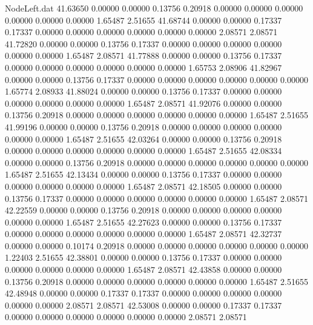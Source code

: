 \begin{filecontents}{NodeLeft.dat}
  41.63650    0.00000    0.00000     0.13756    0.20918    0.00000    0.00000    0.00000    0.00000    0.00000    0.00000    1.65487    2.51655
  41.68744    0.00000    0.00000     0.17337    0.17337    0.00000    0.00000    0.00000    0.00000    0.00000    0.00000    2.08571    2.08571
  41.72820    0.00000    0.00000     0.13756    0.17337    0.00000    0.00000    0.00000    0.00000    0.00000    0.00000    1.65487    2.08571
  41.77888    0.00000    0.00000     0.13756    0.17337    0.00000    0.00000    0.00000    0.00000    0.00000    0.00000    1.65753    2.08906
  41.82967    0.00000    0.00000     0.13756    0.17337    0.00000    0.00000    0.00000    0.00000    0.00000    0.00000    1.65774    2.08933
  41.88024    0.00000    0.00000     0.13756    0.17337    0.00000    0.00000    0.00000    0.00000    0.00000    0.00000    1.65487    2.08571
  41.92076    0.00000    0.00000     0.13756    0.20918    0.00000    0.00000    0.00000    0.00000    0.00000    0.00000    1.65487    2.51655
  41.99196    0.00000    0.00000     0.13756    0.20918    0.00000    0.00000    0.00000    0.00000    0.00000    0.00000    1.65487    2.51655
  42.03264    0.00000    0.00000     0.13756    0.20918    0.00000    0.00000    0.00000    0.00000    0.00000    0.00000    1.65487    2.51655
  42.08334    0.00000    0.00000     0.13756    0.20918    0.00000    0.00000    0.00000    0.00000    0.00000    0.00000    1.65487    2.51655
  42.13434    0.00000    0.00000     0.13756    0.17337    0.00000    0.00000    0.00000    0.00000    0.00000    0.00000    1.65487    2.08571
  42.18505    0.00000    0.00000     0.13756    0.17337    0.00000    0.00000    0.00000    0.00000    0.00000    0.00000    1.65487    2.08571
  42.22559    0.00000    0.00000     0.13756    0.20918    0.00000    0.00000    0.00000    0.00000    0.00000    0.00000    1.65487    2.51655
  42.27623    0.00000    0.00000     0.13756    0.17337    0.00000    0.00000    0.00000    0.00000    0.00000    0.00000    1.65487    2.08571
  42.32737    0.00000    0.00000     0.10174    0.20918    0.00000    0.00000    0.00000    0.00000    0.00000    0.00000    1.22403    2.51655
  42.38801    0.00000    0.00000     0.13756    0.17337    0.00000    0.00000    0.00000    0.00000    0.00000    0.00000    1.65487    2.08571
  42.43858    0.00000    0.00000     0.13756    0.20918    0.00000    0.00000    0.00000    0.00000    0.00000    0.00000    1.65487    2.51655
  42.48948    0.00000    0.00000     0.17337    0.17337    0.00000    0.00000    0.00000    0.00000    0.00000    0.00000    2.08571    2.08571
  42.53008    0.00000    0.00000     0.17337    0.17337    0.00000    0.00000    0.00000    0.00000    0.00000    0.00000    2.08571    2.08571

\end{filecontents}
